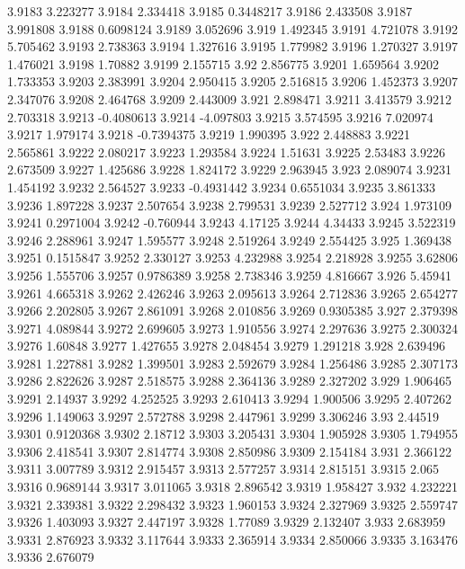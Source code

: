 3.9183  3.223277
3.9184  2.334418
3.9185  0.3448217
3.9186  2.433508
3.9187  3.991808
3.9188  0.6098124
3.9189  3.052696
3.919  1.492345
3.9191  4.721078
3.9192  5.705462
3.9193  2.738363
3.9194  1.327616
3.9195  1.779982
3.9196  1.270327
3.9197  1.476021
3.9198  1.70882
3.9199  2.155715
3.92  2.856775
3.9201  1.659564
3.9202  1.733353
3.9203  2.383991
3.9204  2.950415
3.9205  2.516815
3.9206  1.452373
3.9207  2.347076
3.9208  2.464768
3.9209  2.443009
3.921  2.898471
3.9211  3.413579
3.9212  2.703318
3.9213  -0.4080613
3.9214  -4.097803
3.9215  3.574595
3.9216  7.020974
3.9217  1.979174
3.9218  -0.7394375
3.9219  1.990395
3.922  2.448883
3.9221  2.565861
3.9222  2.080217
3.9223  1.293584
3.9224  1.51631
3.9225  2.53483
3.9226  2.673509
3.9227  1.425686
3.9228  1.824172
3.9229  2.963945
3.923  2.089074
3.9231  1.454192
3.9232  2.564527
3.9233  -0.4931442
3.9234  0.6551034
3.9235  3.861333
3.9236  1.897228
3.9237  2.507654
3.9238  2.799531
3.9239  2.527712
3.924  1.973109
3.9241  0.2971004
3.9242  -0.760944
3.9243  4.17125
3.9244  4.34433
3.9245  3.522319
3.9246  2.288961
3.9247  1.595577
3.9248  2.519264
3.9249  2.554425
3.925  1.369438
3.9251  0.1515847
3.9252  2.330127
3.9253  4.232988
3.9254  2.218928
3.9255  3.62806
3.9256  1.555706
3.9257  0.9786389
3.9258  2.738346
3.9259  4.816667
3.926  5.45941
3.9261  4.665318
3.9262  2.426246
3.9263  2.095613
3.9264  2.712836
3.9265  2.654277
3.9266  2.202805
3.9267  2.861091
3.9268  2.010856
3.9269  0.9305385
3.927  2.379398
3.9271  4.089844
3.9272  2.699605
3.9273  1.910556
3.9274  2.297636
3.9275  2.300324
3.9276  1.60848
3.9277  1.427655
3.9278  2.048454
3.9279  1.291218
3.928  2.639496
3.9281  1.227881
3.9282  1.399501
3.9283  2.592679
3.9284  1.256486
3.9285  2.307173
3.9286  2.822626
3.9287  2.518575
3.9288  2.364136
3.9289  2.327202
3.929  1.906465
3.9291  2.14937
3.9292  4.252525
3.9293  2.610413
3.9294  1.900506
3.9295  2.407262
3.9296  1.149063
3.9297  2.572788
3.9298  2.447961
3.9299  3.306246
3.93  2.44519
3.9301  0.9120368
3.9302  2.18712
3.9303  3.205431
3.9304  1.905928
3.9305  1.794955
3.9306  2.418541
3.9307  2.814774
3.9308  2.850986
3.9309  2.154184
3.931  2.366122
3.9311  3.007789
3.9312  2.915457
3.9313  2.577257
3.9314  2.815151
3.9315  2.065
3.9316  0.9689144
3.9317  3.011065
3.9318  2.896542
3.9319  1.958427
3.932  4.232221
3.9321  2.339381
3.9322  2.298432
3.9323  1.960153
3.9324  2.327969
3.9325  2.559747
3.9326  1.403093
3.9327  2.447197
3.9328  1.77089
3.9329  2.132407
3.933  2.683959
3.9331  2.876923
3.9332  3.117644
3.9333  2.365914
3.9334  2.850066
3.9335  3.163476
3.9336  2.676079

